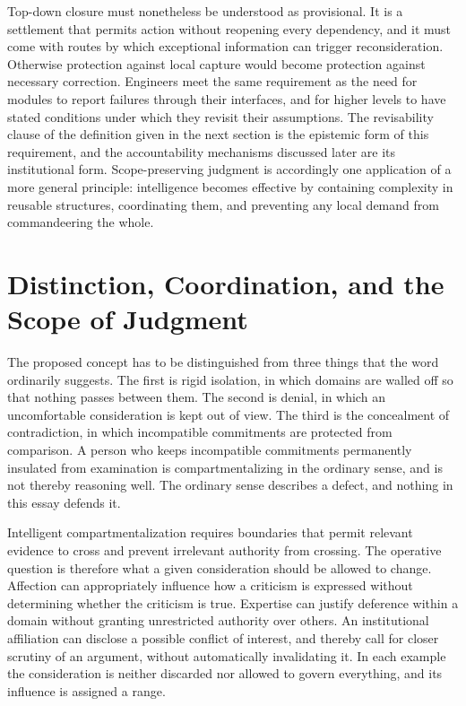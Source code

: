 \documentclass[12pt, a4paper]{article}
\begin{document}
Top-down closure must nonetheless be understood as provisional. It is a settlement that permits action without reopening every dependency, and it must come with routes by which exceptional information can trigger reconsideration. Otherwise protection against local capture would become protection against necessary correction. Engineers meet the same requirement as the need for modules to report failures through their interfaces, and for higher levels to have stated conditions under which they revisit their assumptions. The revisability clause of the definition given in the next section is the epistemic form of this requirement, and the accountability mechanisms discussed later are its institutional form. Scope-preserving judgment is accordingly one application of a more general principle: intelligence becomes effective by containing complexity in reusable structures, coordinating them, and preventing any local demand from commandeering the whole.

\section{Distinction, Coordination, and the Scope of Judgment}

The proposed concept has to be distinguished from three things that the word ordinarily suggests. The first is rigid isolation, in which domains are walled off so that nothing passes between them. The second is denial, in which an uncomfortable consideration is kept out of view. The third is the concealment of contradiction, in which incompatible commitments are protected from comparison. A person who keeps incompatible commitments permanently insulated from examination is compartmentalizing in the ordinary sense, and is not thereby reasoning well. The ordinary sense describes a defect, and nothing in this essay defends it.

Intelligent compartmentalization requires boundaries that permit relevant evidence to cross and prevent irrelevant authority from crossing. The operative question is therefore what a given consideration should be allowed to change. Affection can appropriately influence how a criticism is expressed without determining whether the criticism is true. Expertise can justify deference within a domain without granting unrestricted authority over others. An institutional affiliation can disclose a possible conflict of interest, and thereby call for closer scrutiny of an argument, without automatically invalidating it. In each example the consideration is neither discarded nor allowed to govern everything, and its influence is assigned a range.
\end{document}
